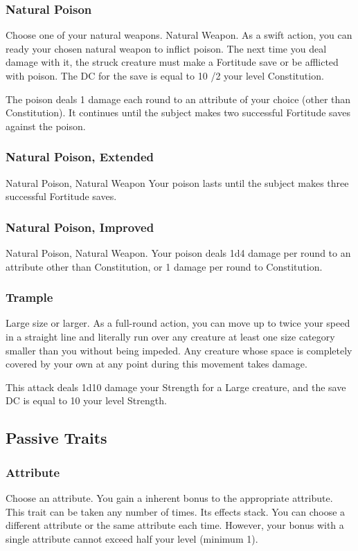 \subsubsection{Natural Poison}
Choose one of your natural weapons.
\featpre Natural Weapon.
\featben As a swift action, you can ready your chosen natural weapon to inflict poison. The next time you deal damage with it, the struck creature must make a Fortitude save or be afflicted with poison. The DC for the save is equal to 10 /2 your level \add Constitution.
\par The poison deals 1 damage each round to an attribute of your choice (other than Constitution). It continues until the subject makes two successful Fortitude saves against the poison.

\subsubsection{Natural Poison, Extended}
\featpre Natural Poison, Natural Weapon
\featben Your poison lasts until the subject makes three successful Fortitude saves.

\subsubsection{Natural Poison, Improved}
\featpre Natural Poison, Natural Weapon.
\featben Your poison deals 1d4 damage per round to an attribute other than Constitution, or 1 damage per round to Constitution.

\subsubsection{Trample}
\featpre Large size or larger.
\featben As a full-round action, you can move up to twice your speed in a straight line and literally run over any creature at least one size category smaller than you without being impeded. Any creature whose space is completely covered by your own at any point during this movement takes damage.

This attack deals 1d10 damage \add your Strength for a Large creature, and the save DC is equal to 10 \add your level \add Strength.

\subsection{Passive Traits}

\subsubsection{Attribute}
Choose an attribute.
\featben You gain a  inherent bonus to the appropriate attribute.
 This trait can be taken any number of times. Its effects stack. You can choose a different attribute or the same attribute each time. However, your bonus with a single attribute cannot exceed half your level (minimum 1).

